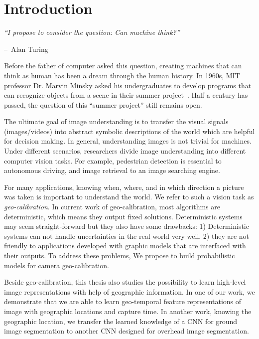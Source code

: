 \chapter{Introduction}
\label{chap:intro}

\makeatletter
\newenvironment{chapquote}[2][2em]
{\setlength{\@tempdima}{#1} \def\chapquote@author{#2} \parshape 1
  \@tempdima \dimexpr\textwidth-2\@tempdima\relax \itshape}
{\par\normalfont\hfill--\
\chapquote@author\hspace*{\@tempdima}\par\bigskip}
\makeatother

\begin{chapquote}{Alan Turing}
  ``I propose to consider the question: Can machine think?''
\end{chapquote}

Before the father of computer asked this question, creating
machines that can think as human has been a dream through the human
history. In 1960s, MIT professor Dr. Marvin Minsky asked his
undergraduates to develop programs that can recognize objects from a
scene in their summer project~\cite{boden2006mind}. Half a century has
passed, the question of this ``summer project'' still remains open.

The ultimate goal of image understanding is to transfer the visual
signals (images/videos) into abstract symbolic descriptions of the
world which are helpful for decision making.
In general, understanding images is not trivial for machines.
Under different scenarios, researchers divide image
understanding into different computer vision tasks. For example,
pedestrian detection is essential to autonomous driving, and image
retrieval to an image searching engine.

For many applications, knowing when, where, and in which direction a
picture was taken is important to understand the world. We refer to 
such a vision task as {\em geo-calibration}.
In current work of geo-calibration, most algorithms are
deterministic, which means they output fixed solutions. Deterministic
systems may seem straight-forward but they also have some 
drawbacks: 1) Deterministic systems can not handle uncertainties in
the real world very well. 2) they are not
friendly to applications developed with graphic models that are
interfaced with their outputs. To address these problems, We propose
to build probabilistic models for camera geo-calibration.

Beside geo-calibration, this thesis also studies the possibility to
learn high-level image representations with help of geographic
information. In one of our work, we demonstrate that we are able to
learn geo-temporal feature representations of image with geographic
locations and capture time. In another work, knowing the geographic
location, we transfer the learned knowledge of a CNN for ground image
segmentation to another CNN designed for overhead image segmentation.

